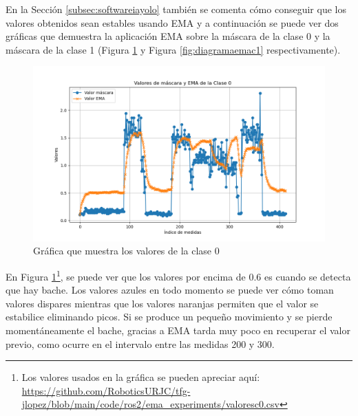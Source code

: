 En la Sección \ref{subsec:softwareiayolo} también se comenta cómo conseguir que los valores obtenidos sean estables usando \acs{EMA} y a continuación se puede ver dos gráficas que demuestra la aplicación EMA sobre la máscara de la clase 0 y la máscara de la clase 1 (Figura \ref{fig:diagramaemac0} y Figura \ref{fig:diagramaemac1} respectivamente).

\begin{figure} [h!]
	\begin{center}
			\includegraphics[width=15cm]{figs/cap7/GraficaC0.png}
		\end{center}
	\caption{Gráfica que muestra los valores de la clase 0}
	\label{fig:diagramaemac0}
\end{figure}

En Figura \ref{fig:diagramaemac0}\footnote{Los valores usados en la gráfica se pueden apreciar aquí: \url{https://github.com/RoboticsURJC/tfg-jlopez/blob/main/code/ros2/ema_experiments/valoresc0.csv}}, se puede ver que los valores por encima de 0.6 es cuando se detecta que hay bache. Los valores azules en todo momento se puede ver cómo toman valores dispares mientras que los valores naranjas permiten que el valor se estabilice eliminando picos. Si se produce un pequeño movimiento y se pierde momentáneamente el bache, gracias a EMA tarda muy poco en recuperar el valor previo, como ocurre en el intervalo entre las medidas 200 y 300.

